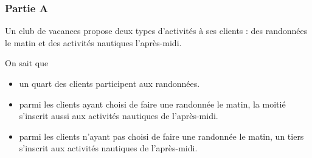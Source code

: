 \subsubsection*{Partie A}
Un club de vacances propose deux types d'activités à ses clients : des randonnées le matin et des activités nautiques l'après-midi.

\vspace{5mm}
On sait que
\begin{itemize}[label=$\bullet$]
	\item un quart des clients participent aux randonnées.
	\item parmi les clients ayant choisi de faire une randonnée le matin, la moitié s'inscrit aussi aux activités nautiques de l'après-midi.
	\item parmi les clients n'ayant pas choisi de faire une randonnée le matin, un tiers s'inscrit aux activités nautiques de l'après-midi.
\end{itemize}

